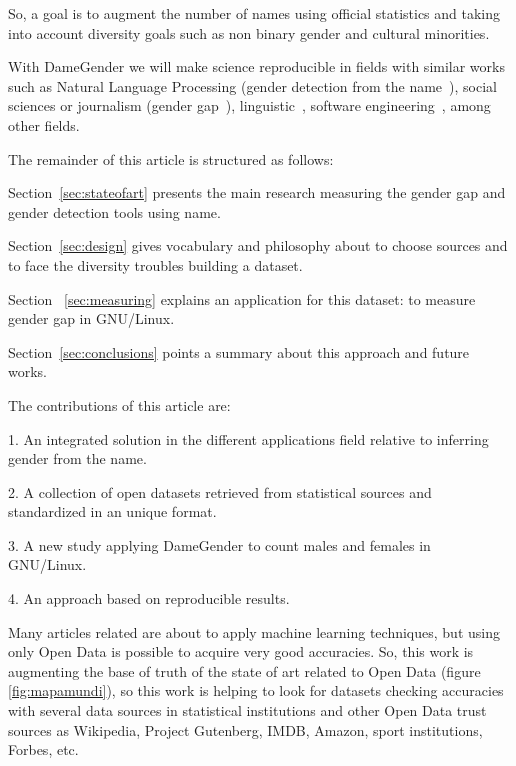 \documentclass[a4paper]{article}
\begin{document}
So, a goal is to augment the number of names using official statistics
and taking into account diversity goals such as non binary gender and
cultural minorities.

With DameGender we will make science reproducible\cite{peng2011reproducible}
in fields with similar works such as Natural Language Processing
(gender detection from the name~\cite{sun2019mitigating}), social
sciences or journalism (gender
gap~\cite{holman2018gender,mislove2011understanding,niemi2017gendered,de2014genero}),
linguistic~\cite{hutson2016gender,al2009socio},
software engineering~\cite{vasilescu2012gender}, among other fields.

The remainder of this article is structured as follows:

Section~\ref{sec:stateofart} presents the main research measuring the
gender gap and gender detection tools using name.

Section~\ref{sec:design} gives vocabulary and philosophy about to
choose sources and to face the diversity troubles building a dataset.

Section ~\ref{sec:measuring} explains an application for this
dataset: to measure gender gap in GNU/Linux.

Section~\ref{sec:conclusions} points a summary about this approach and
future works.

The contributions of this article are:

1. An integrated solution in the different applications field relative
to inferring gender from the name.

2. A collection of open datasets retrieved from statistical sources
and standardized in an unique format.

3. A new study applying DameGender to count males and females in
GNU/Linux.

4. An approach based on reproducible results.

Many articles related are about to apply machine learning techniques,
but using only Open Data is possible to acquire very good accuracies.
So, this work is augmenting the base of truth of the state of art
related to Open Data (figure \ref{fig:mapamundi}), so this work is
helping to look for datasets checking accuracies with several data
sources in statistical institutions and other Open Data trust sources
as Wikipedia, Project Gutenberg, IMDB, Amazon, sport institutions,
Forbes, etc.
\end{document}
